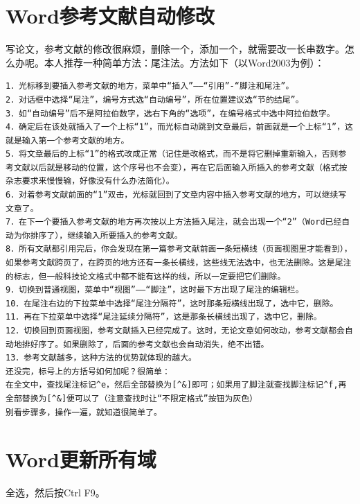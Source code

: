 \section{Word参考文献自动修改}
写论文，参考文献的修改很麻烦，删除一个，添加一个，就需要改一长串数字。怎么办呢。本人推荐一种简单方法：尾注法。方法如下（以Word2003为例）：
\begin{verbatim} 
1．光标移到要插入参考文献的地方，菜单中“插入”——“引用”-“脚注和尾注”。   
2．对话框中选择“尾注”，编号方式选“自动编号”，所在位置建议选“节的结尾”。   
3．如“自动编号”后不是阿拉伯数字，选右下角的“选项”，在编号格式中选中阿拉伯数字。   
4．确定后在该处就插入了一个上标“1”，而光标自动跳到文章最后，前面就是一个上标“1”，这就是输入第一个参考文献的地方。   
5．将文章最后的上标“1”的格式改成正常（记住是改格式，而不是将它删掉重新输入，否则参考文献以后就是移动的位置，这个序号也不会变），再在它后面输入所插入的参考文献（格式按杂志要求来慢慢输，好像没有什么办法简化）。   
6．对着参考文献前面的“1”双击，光标就回到了文章内容中插入参考文献的地方，可以继续写文章了。   
7．在下一个要插入参考文献的地方再次按以上方法插入尾注，就会出现一个“2”（Word已经自动为你排序了），继续输入所要插入的参考文献。   
8．所有文献都引用完后，你会发现在第一篇参考文献前面一条短横线（页面视图里才能看到），如果参考文献跨页了，在跨页的地方还有一条长横线，这些线无法选中，也无法删除。这是尾注的标志，但一般科技论文格式中都不能有这样的线，所以一定要把它们删除。   
9．切换到普通视图，菜单中“视图”——“脚注”，这时最下方出现了尾注的编辑栏。   
10．在尾注右边的下拉菜单中选择“尾注分隔符”，这时那条短横线出现了，选中它，删除。   
11．再在下拉菜单中选择“尾注延续分隔符”，这是那条长横线出现了，选中它，删除。   
12．切换回到页面视图，参考文献插入已经完成了。这时，无论文章如何改动，参考文献都会自动地排好序了。如果删除了，后面的参考文献也会自动消失，绝不出错。   
13．参考文献越多，这种方法的优势就体现的越大。
还没完，标号上的方括号如何加呢？很简单：
在全文中，查找尾注标记^e，然后全部替换为[^&]即可；如果用了脚注就查找脚注标记^f,再全部替换为[^&]便可以了（注意查找时让“不限定格式”按钮为灰色）
别看步骤多，操作一遍，就知道很简单了。
\end{verbatim}
\section{Word更新所有域}
全选，然后按Ctrl F9。
